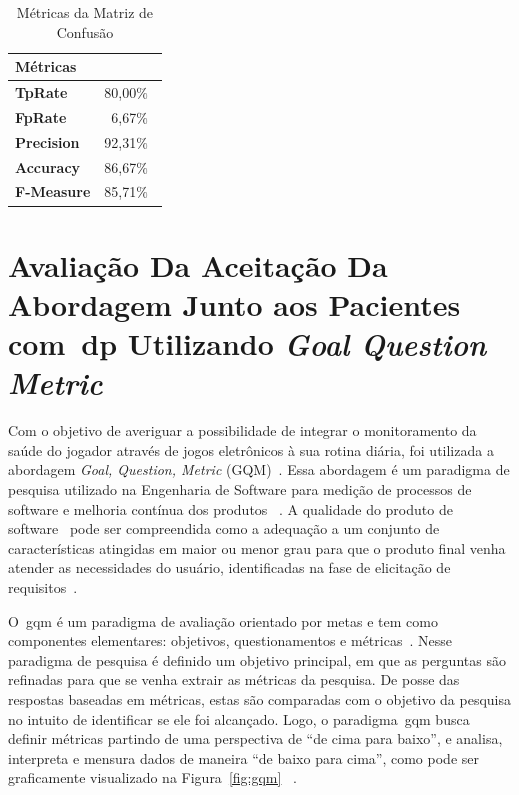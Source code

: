 \begin{table}[!htbp]
\label{table:metricasmatrizconfusao}
\caption{Métricas da Matriz de Confusão}
\centering
\begin{tabular}{|l|r|}
\hline
\multicolumn{2}{|l|}{\textbf{Métricas}} \\ \hline
\textbf{TpRate}                    & 80,00$\%$\                 \\ \hline
\textbf{FpRate}                    & 6,67$\%$\                \\ \hline
\textbf{Precision}                 & 92,31$\%$\                \\ \hline
\textbf{Accuracy}                  & 86,67$\%$\                \\ \hline
\textbf{F-Measure}                 & 85,71$\%$\                \\ \hline
\end{tabular}
\end{table}








\section{Avaliação Da Aceitação Da Abordagem Junto aos Pacientes com~\ac{dp} Utilizando \textit{Goal Question Metric}}\label{gqm_usuarios}


Com o objetivo de averiguar a possibilidade de integrar o monitoramento da saúde do jogador através de jogos eletrônicos à sua rotina diária, foi utilizada a abordagem \textit{Goal, Question, Metric} (GQM)~\cite{van1999goal}. Essa abordagem é um paradigma de pesquisa utilizado na Engenharia de Software para medição de processos de software e melhoria contínua dos produtos ~\cite{saraiva2006,elicquest05}. A qualidade do produto de software~\cite{saraiva2006} pode ser compreendida como a adequação a um conjunto de características atingidas em maior ou menor grau para que o produto final venha atender as necessidades do usuário, identificadas na fase de elicitação de requisitos~\cite{elicquest05}.

O~\ac{gqm} é um paradigma de avaliação orientado por metas e tem como componentes elementares: objetivos, questionamentos e métricas~\cite{saraiva2006}. Nesse paradigma de pesquisa é definido um objetivo principal, em que as perguntas são refinadas para que se venha extrair as métricas da pesquisa. De posse das respostas baseadas em métricas, estas são comparadas com o objetivo da pesquisa no intuito de identificar se ele foi alcançado. Logo, o paradigma~\ac{gqm} busca definir métricas partindo de uma perspectiva de ``de cima para baixo'', e analisa, interpreta e mensura dados de maneira ``de baixo para cima'', como pode ser graficamente visualizado na Figura~\ref{fig:gqm} ~\cite{van1999goal}. 

